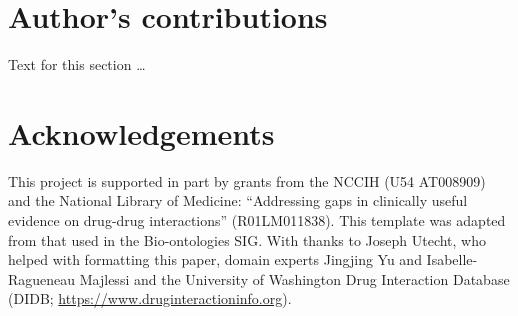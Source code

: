 \documentclass{bmcart}
\begin{document}
\begin{backmatter}

\section*{Author's contributions}
    Text for this section \ldots

\section*{Acknowledgements}
This project is supported in part by grants from the NCCIH (U54 AT008909) and the National Library of Medicine: “Addressing gaps in clinically useful evidence on drug-drug interactions” (R01LM011838).
This template was adapted from that used in the Bio-ontologies SIG.
With thanks to Joseph Utecht, who helped with formatting this paper, domain experts Jingjing Yu and Isabelle-Ragueneau Majlessi and the University of Washington Drug Interaction Database (DIDB; \url{https://www.druginteractioninfo.org}).




\end{backmatter}
\end{document}

